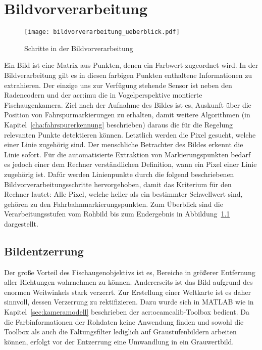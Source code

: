 \chapter{Bildvorverarbeitung \dcfirstauthorshort}
\label{cha:bildvorverarbeitung}

\begin{figure}[htbp] %
	\centering
	\texttt{[image: bildvorverarbeitung\_ueberblick.pdf]}
	\caption{Schritte in der Bildvorverarbeitung}
	\label{fig:bildvorverarbeitung_ueberblick}
\end{figure} 

Ein Bild ist eine Matrix aus Punkten, denen ein Farbwert zugeordnet wird. In der Bildverarbeitung gilt es in diesen farbigen Punkten enthaltene Informationen zu extrahieren. Der einzige uns zur Verfügung stehende Sensor ist neben den Radencodern und der \gls{acr:imu} die in Vogelperspektive montierte Fischaugenkamera. Ziel nach der Aufnahme des Bildes ist es, Auskunft über die Position von Fahrspurmarkierungen zu erhalten, damit weitere Algorithmen (in Kapitel~\ref{cha:fahrspurerkennung} beschrieben) daraus die für die Regelung relevanten Punkte detektieren können. Letztlich werden die Pixel gesucht, welche einer Linie zugehörig sind. Der menschliche Betrachter des Bildes erkennt die Linie sofort. Für die automatisierte Extraktion von Markierungspunkten bedarf es jedoch einer dem Rechner verständlichen Definition, wann ein Pixel einer Linie zugehörig ist. Dafür werden Linienpunkte durch die folgend beschriebenen Bildvorverarbeitungsschritte hervorgehoben, damit das Kriterium für den Rechner lautet: Alle Pixel, welche heller als ein bestimmter Schwellwert sind, gehören zu den Fahrbahnmarkierungspunkten. Zum Überblick sind die Verarbeitungsstufen vom Rohbild bis zum Endergebnis in Abbildung~\ref{fig:bildvorverarbeitung_ueberblick} dargestellt.

\section{Bildentzerrung}

Der große Vorteil des Fischaugenobjektivs ist es, Bereiche in größerer Entfernung aller Richtungen wahrnehmen zu können. Andererseits ist das Bild aufgrund des enormen Weitwinkels stark verzerrt. Zur Erstellung einer Weltkarte ist es daher sinnvoll, dessen Verzerrung zu rektifizieren. Dazu wurde sich in MATLAB wie in Kapitel~\ref{sec:kameramodell} beschrieben der \gls{acr:ocamcalib}-Toolbox bedient. Da die Farbinformationen der Rohdaten keine Anwendung finden und sowohl die Toolbox als auch die Faltungsfilter lediglich auf Graustufenbildern arbeiten können, erfolgt vor der Entzerrung eine Umwandlung in ein Grauwertbild.


